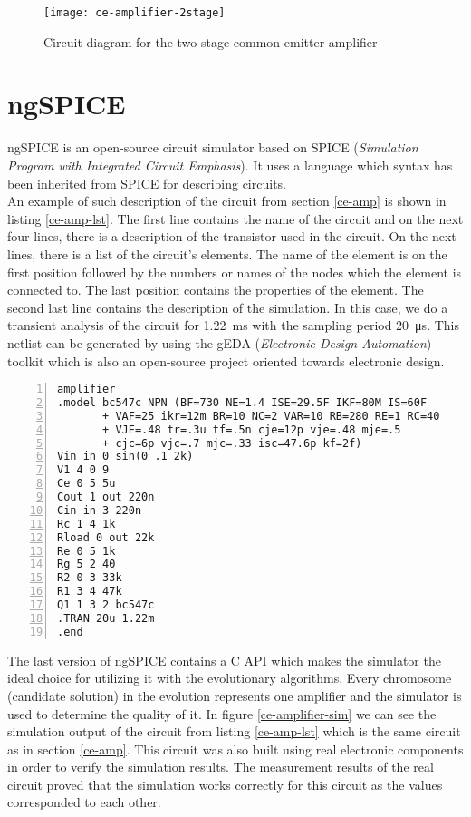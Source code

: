 \begin{figure}[H]
    \centering
    \texttt{[image: ce-amplifier-2stage]} \label{ce-amplifier-2stage}
    \caption{Circuit diagram for the two stage common emitter amplifier}
\end{figure}

\section{ngSPICE}
ngSPICE is an open-source circuit simulator based on SPICE (\textit{Simulation Program with Integrated Circuit Emphasis}). It uses a language which syntax has been inherited from SPICE for describing circuits.\\
An example of such description of the circuit from section \ref{ce-amp} is shown in listing \ref{ce-amp-lst}. The first line contains the name of the circuit and on the next four lines, there is a description of the transistor used in the circuit. On the next lines, there is a list of the circuit's elements. The name of the element is on the first position followed by the numbers or names of the nodes which the element is connected to. The last position contains the properties of the element. The second last line contains the description of the simulation. In this case, we do a transient analysis of the circuit for \SI{1.22}{\milli\second} with the sampling period \SI{20}{\micro\second}. This netlist can be generated by using the gEDA (\textit{Electronic Design Automation}) toolkit which is also an open-source project oriented towards electronic design.

\begin{lstlisting}[caption={description of an amplifier using the SPICE syntax},
                   label={ce-amp-lst},
                   captionpos=b,
                   numbers=left]
 amplifier
.model bc547c NPN (BF=730 NE=1.4 ISE=29.5F IKF=80M IS=60F
       + VAF=25 ikr=12m BR=10 NC=2 VAR=10 RB=280 RE=1 RC=40
       + VJE=.48 tr=.3u tf=.5n cje=12p vje=.48 mje=.5
       + cjc=6p vjc=.7 mjc=.33 isc=47.6p kf=2f)
Vin in 0 sin(0 .1 2k)
V1 4 0 9
Ce 0 5 5u
Cout 1 out 220n
Cin in 3 220n
Rc 1 4 1k
Rload 0 out 22k
Re 0 5 1k
Rg 5 2 40
R2 0 3 33k
R1 3 4 47k
Q1 1 3 2 bc547c
.TRAN 20u 1.22m
.end
\end{lstlisting}

The last version of ngSPICE contains a C API which makes the simulator the ideal choice for utilizing it with the evolutionary algorithms. Every chromosome (candidate solution) in the evolution represents one amplifier and the simulator is used to determine the quality of it. In figure \ref{ce-amplifier-sim} we can see the simulation output of the circuit from listing \ref{ce-amp-lst} which is the same circuit as in section \ref{ce-amp}. This circuit was also built using real electronic components in order to verify the simulation results. The measurement results of the real circuit proved that the simulation works correctly for this circuit as the values corresponded to each other.\\

